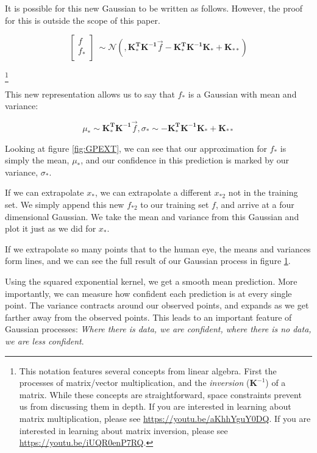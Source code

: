 \documentclass{sig-alternate}
\begin{document}
 It is possible for this new Gaussian to be written as follows.
 However, the proof for this is outside the scope of this paper.
 
\[\begin{bmatrix}
    f \\
    f_{*} \\
  \end{bmatrix} 
  ~ \sim \mathcal{N}(
    ,\mathbf{K_{*}^{T} K^{-1}} \Vec{f}
    -\mathbf{K_{*}^{T} K^{-1} K_{*}} + \mathbf{K_{**}} )\]
    
\footnote{This notation features several concepts from linear algebra.
First the processes of matrix/vector multiplication, and the \textit{inversion} ($\mathbf{K}^{-1}$) of a matrix.
While these concepts are straightforward, space constraints prevent us from discussing them in depth. If you are interested in learning about matrix multiplication, please see \url{https://youtu.be/aKhhYguY0DQ}.
If you are interested in learning about matrix inversion, please see \url{https://youtu.be/iUQR0enP7RQ}.}

This new representation allows us to say that $f_{*}$ is a Gaussian with mean and variance:

\[ \mu_{*} \sim \mathbf{K_{*}^{T} K^{-1}} \Vec{f},  \sigma_{*} \sim  -\mathbf{K_{*}^{T} K^{-1} K_{*}} + \mathbf{K_{**}}\]

Looking at figure \ref{fig:GPEXT}, we can see that our approximation for $f_{*}$ is simply the mean, $\mu_{*}$, and our confidence in this prediction is marked by our variance, $\sigma_{*}$.

If we can extrapolate $x_{*}$, we can extrapolate a different $x_{*2}$ not in the training set.
We simply append this new $f_{*2}$ to our training set $f$, and arrive at a four dimensional Gaussian.
We take the mean and variance from this Gaussian and plot it just as we did for $x_{*}$.

If we extrapolate so many points that to the human eye, the means and variances form lines, and we can see the full result of our Gaussian process in figure \ref{fig:GP-Complete}.

\begin{figure}[htb]
\centering
{}
\caption{}
\label{fig:GP-Complete}
\end{figure}

Using the squared exponential kernel, we get a smooth mean prediction.
More importantly, we can measure how confident each prediction is at every single point.
The variance contracts around our observed points, and expands as we get farther away from the observed points.
This leads to an important feature of Gaussian processes: \textit{Where there is data, we are confident, where there is no data, we are less confident}.
\end{document}
